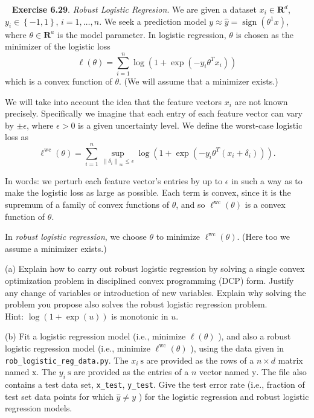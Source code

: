 \documentclass[12pt,reqno]{article}
\theoremstyle{definition}
\numberwithin{equation}{section}
\begin{document}
~\cite{EE364a-extra} \textbf{Exercise 6.29}. \textit{Robust Logistic Regresion}.
We are given a dataset $x_i \in \mathbf{R}^d$, $y_i \in \left\{ -1, 1 \right\}$, $i = 1, \ldots, n$.
We seek a prediction model $y \approx \hat{y}=\operatorname{sign}\left(\theta^1 x\right)$, where $\theta \in \mathbf{R}^a$ is the model parameter. In logistic regression, $\theta$ is chosen as the minimizer of the logistic loss
\[
\ell(\theta)=\sum_{i=1}^n \log \left(1+\exp \left(-y_i \theta^T x_i\right)\right)
\]
which is a convex function of $\theta$. (We will assume that a minimizer exists.)

\noindent We will take into account the idea that the feature vectors $x_i$ are not known precisely.
Specifically we imagine that each entry of each feature vector can vary by $\pm \epsilon$, where $\epsilon>0$ is a given uncertainty level.
We define the worst-case logistic loss as
\[
\ell^{\mathrm{wc}}(\theta)=\sum_{i=1}^n \sup _{\left\|\delta_i\right\|_{\infty} \leq \epsilon} \log \left(1+\exp \left(-y_i \theta^T\left(x_i+\delta_i\right)\right)\right) .
\]

\noindent In words: we perturb each feature vector's entries by up to $\epsilon$ in such a way as to make the logistic loss as large as possible. Each term is convex, since it is the supremum of a family of convex functions of $\theta$, and so $\ell^{\mathrm{wc}}(\theta)$ is a convex function of $\theta$.

\vspace{0.1cm}
\noindent In \textit{robust logistic regression}, we choose $\theta$ to minimize $\ell^{\mathrm{wc}}(\theta)$.
(Here too we assume a minimizer exists.)

\vspace{0.1cm}
\noindent (a) Explain how to carry out robust logistic regression by solving a single convex optimization problem in disciplined convex programming (DCP) form.
Justify any change of variables or introduction of new variables.
Explain why solving the problem you propose also solves the robust logistic regression problem.\\
\noindent Hint: $\log (1+\exp (u))$ is monotonic in $u$.

\vspace{0.1cm}
\noindent (b) Fit a logistic regression model (i.e., minimize $\ell(\theta)$ ), and also a robust logistic regression model
(i.e., minimize $\ell^{\mathrm{wc}}(\theta)$ ), using the data given in \lstinline|rob_logistic_reg_data.py|.
The $x_i \mathrm{~s}$ are provided as the rows of a $n \times d$ matrix named $\mathrm{x}$.
The $y_i \mathrm{~s}$ are provided as the entries of a $n$ vector named $\mathrm{y}$.
The file also contains a test data set, \lstinline|x_test|, \lstinline|y_test|. Give the test error rate (i.e., fraction of test set data points for which $\hat{y} \neq y$ )
for the logistic regression and robust logistic regression models.
\end{document}
